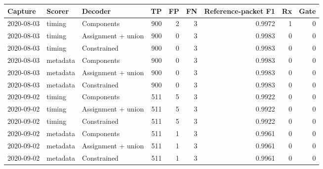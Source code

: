 \begin{tabularx}{\linewidth}{@{}lllrrrrrr@{}}\toprule
Capture & Scorer & Decoder & TP & FP & FN & Reference-packet F1 & Rx & Gate \\\midrule
2020-08-03 & timing & Components & 900 & 2 & 3 & 0.9972 & 1 & 0 \\
2020-08-03 & timing & Assignment + union & 900 & 0 & 3 & 0.9983 & 0 & 0 \\
2020-08-03 & timing & Constrained & 900 & 0 & 3 & 0.9983 & 0 & 0 \\
2020-08-03 & metadata & Components & 900 & 0 & 3 & 0.9983 & 0 & 0 \\
2020-08-03 & metadata & Assignment + union & 900 & 0 & 3 & 0.9983 & 0 & 0 \\
2020-08-03 & metadata & Constrained & 900 & 0 & 3 & 0.9983 & 0 & 0 \\
2020-09-02 & timing & Components & 511 & 5 & 3 & 0.9922 & 0 & 0 \\
2020-09-02 & timing & Assignment + union & 511 & 5 & 3 & 0.9922 & 0 & 0 \\
2020-09-02 & timing & Constrained & 511 & 5 & 3 & 0.9922 & 0 & 0 \\
2020-09-02 & metadata & Components & 511 & 1 & 3 & 0.9961 & 0 & 0 \\
2020-09-02 & metadata & Assignment + union & 511 & 1 & 3 & 0.9961 & 0 & 0 \\
2020-09-02 & metadata & Constrained & 511 & 1 & 3 & 0.9961 & 0 & 0 \\
\bottomrule\end{tabularx}
